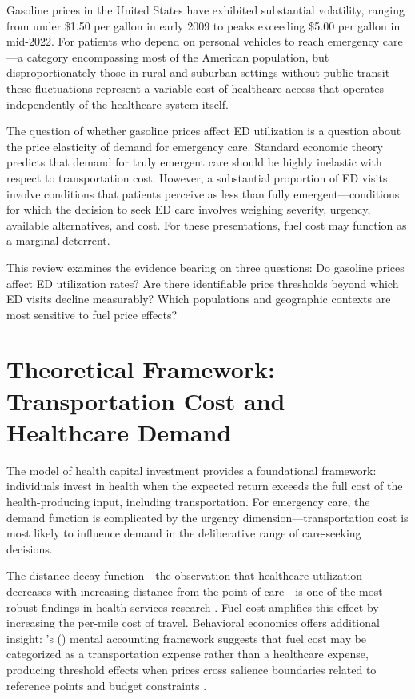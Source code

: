 \documentclass[12pt, a4paper]{article}
\begin{document}
Gasoline prices in the United States have exhibited substantial volatility, ranging from under \$1.50 per gallon in early 2009 to peaks exceeding \$5.00 per gallon in mid-2022. For patients who depend on personal vehicles to reach emergency care---a category encompassing most of the American population, but disproportionately those in rural and suburban settings without public transit---these fluctuations represent a variable cost of healthcare access that operates independently of the healthcare system itself.

The question of whether gasoline prices affect ED utilization is a question about the price elasticity of demand for emergency care. Standard economic theory predicts that demand for truly emergent care should be highly inelastic with respect to transportation cost. However, a substantial proportion of ED visits involve conditions that patients perceive as less than fully emergent---conditions for which the decision to seek ED care involves weighing severity, urgency, available alternatives, and cost. For these presentations, fuel cost may function as a marginal deterrent.

This review examines the evidence bearing on three questions: Do gasoline prices affect ED utilization rates? Are there identifiable price thresholds beyond which ED visits decline measurably? Which populations and geographic contexts are most sensitive to fuel price effects?

\section{Theoretical Framework: Transportation Cost and Healthcare Demand}

The \citet{grossman1972} model of health capital investment provides a foundational framework: individuals invest in health when the expected return exceeds the full cost of the health-producing input, including transportation. For emergency care, the demand function is complicated by the urgency dimension---transportation cost is most likely to influence demand in the deliberative range of care-seeking decisions.

The distance decay function---the observation that healthcare utilization decreases with increasing distance from the point of care---is one of the most robust findings in health services research \citep{arcury2005}. Fuel cost amplifies this effect by increasing the per-mile cost of travel. Behavioral economics offers additional insight: \citeauthor{thaler1999}'s (\citeyear{thaler1999}) mental accounting framework suggests that fuel cost may be categorized as a transportation expense rather than a healthcare expense, producing threshold effects when prices cross salience boundaries related to reference points and budget constraints \citep{kahneman1979}.
\end{document}
